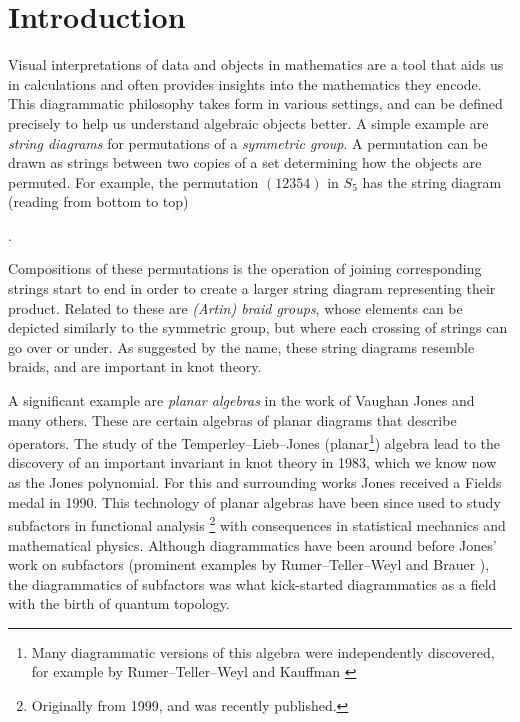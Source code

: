 \chapter{Introduction}

Visual interpretations of data and objects in mathematics are a tool that aids us in calculations and often provides insights into the mathematics they encode. This diagrammatic philosophy takes form in various settings, and can be defined precisely to help us understand algebraic objects better. A simple example are \textit{string diagrams} for permutations of a \textit{symmetric group}. A permutation can be drawn as strings between two copies of a set determining how the objects are permuted. For example, the permutation $(12354)$ in $S_5$ has the string diagram (reading from bottom to top)
\begin{center}
    .
\end{center}
Compositions of these permutations is the operation of joining corresponding strings start to end in order to create a larger string diagram representing their product. Related to these are \textit{(Artin) braid groups}, whose elements can be depicted similarly to the symmetric group, but where each crossing of strings can go over or under. As suggested by the name, these string diagrams resemble braids, and are important in knot theory.

A significant example are \textit{planar algebras} in the work of Vaughan Jones and many others. These are certain algebras of planar diagrams that describe operators. The study of the Temperley--Lieb--Jones (planar\footnote{Many diagrammatic versions of this algebra were independently discovered, for example by Rumer--Teller--Weyl \cite{weyl-diagrammatics} and Kauffman \cite{kauffman-tl-planar-algebra}}) algebra lead to the discovery of an important invariant in knot theory \cite{jones-knot-polynomial} in 1983, which we know now as the Jones polynomial. For this and surrounding works Jones received a Fields medal in 1990. This technology of planar algebras have been since used to study subfactors in functional analysis \cite{jones-planar-algebra}\footnote{Originally from 1999, and was recently published.} with consequences in statistical mechanics and mathematical physics. Although diagrammatics have been around before Jones' work on subfactors (prominent examples by Rumer--Teller--Weyl \cite{weyl-diagrammatics} and Brauer \cite{brauer-diagrammatics}), the diagrammatics of subfactors was what kick-started diagrammatics as a field with the birth of quantum topology.

